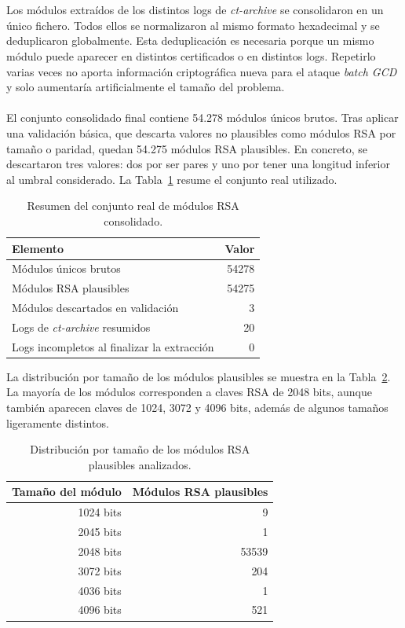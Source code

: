 \\
\\
Los módulos extraídos de los distintos logs de \textit{ct-archive} se consolidaron en un único fichero. Todos ellos se normalizaron al mismo formato hexadecimal y se deduplicaron globalmente. Esta deduplicación es necesaria porque un mismo módulo puede aparecer en distintos certificados o en distintos logs. Repetirlo varias veces no aporta información criptográfica nueva para el ataque \textit{batch GCD} y solo aumentaría artificialmente el tamaño del problema.
\\
\\
El conjunto consolidado final contiene 54.278 módulos únicos brutos. Tras aplicar una validación básica, que descarta valores no plausibles como módulos RSA por tamaño o paridad, quedan 54.275 módulos RSA plausibles. En concreto, se descartaron tres valores: dos por ser pares y uno por tener una longitud inferior al umbral considerado. La Tabla~\ref{tab:modulos_reales_finales} resume el conjunto real utilizado.

\begin{table}[htbp]
    \centering
    \small
    \begin{tabular}{|l|r|}
        \hline
        Elemento & Valor \\
        \hline
        Módulos únicos brutos & 54278 \\
        Módulos RSA plausibles & 54275 \\
        Módulos descartados en validación & 3 \\
        Logs de \textit{ct-archive} resumidos & 20 \\
        Logs incompletos al finalizar la extracción & 0 \\
        \hline
    \end{tabular}
    \caption{Resumen del conjunto real de módulos RSA consolidado.}
    \label{tab:modulos_reales_finales}
\end{table}

La distribución por tamaño de los módulos plausibles se muestra en la Tabla~\ref{tab:distribucion_bits_reales}. La mayoría de los módulos corresponden a claves RSA de 2048 bits, aunque también aparecen claves de 1024, 3072 y 4096 bits, además de algunos tamaños ligeramente distintos.

\begin{table}[htbp]
    \centering
    \small
    \begin{tabular}{|r|r|}
        \hline
        Tamaño del módulo & Módulos RSA plausibles \\
        \hline
        1024 bits & 9 \\
        2045 bits & 1 \\
        2048 bits & 53539 \\
        3072 bits & 204 \\
        4036 bits & 1 \\
        4096 bits & 521 \\
        \hline
    \end{tabular}
    \caption{Distribución por tamaño de los módulos RSA plausibles analizados.}
    \label{tab:distribucion_bits_reales}
\end{table}

